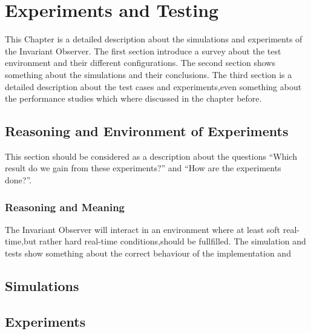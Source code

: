 \chapter{Experiments and Testing}

\ifpdf
    \graphicspath{{Chapter3/Figs/Raster/}{Chapter3/Figs/PDF/}{Chapter3/Figs/}}
\else
    \graphicspath{{Chapter3/Figs/Vector/}{Chapter3/Figs/}}
\fi

This Chapter is a detailed description about the simulations and experiments of the Invariant Observer.
The first section introduce a survey about the test environment and their different configurations.
The second section shows something about the simulations and their conclusions.
The third section is a detailed description about the test cases and experiments,even something about the performance studies which where
discussed in the chapter before. \\



\section{Reasoning and Environment of Experiments}
This section should be considered as a description about the questions ``Which result do we gain from these experiments?'' and ``How are the experiments done?''. 

\subsection{Reasoning and Meaning}
The Invariant Observer will interact in an environment where at least soft real-time,but rather hard real-time conditions,should be fullfilled.
The simulation and tests show something about the correct behaviour of the implementation and 

%


%
\section{Simulations}
\section{Experiments}
%
